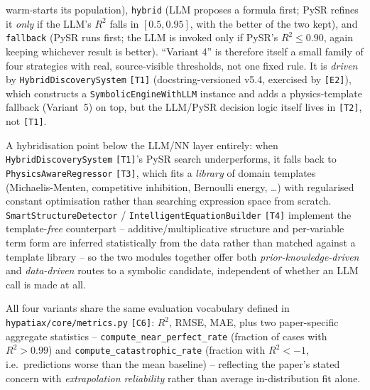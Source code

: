 \documentclass[11pt,a4paper]{article}
\newcommand{\code}[1]{\texttt{\small #1}}
\begin{document}
\begin{description}
        warm-starts its population), \code{hybrid} (LLM proposes a formula
        first; PySR refines it \emph{only} if the LLM's $R^2$ falls in
        $[0.5, 0.95]$, with the better of the two kept), and
        \code{fallback} (PySR runs first; the LLM is invoked only if PySR's
        $R^2 \leq 0.90$, again keeping whichever result is better). ``Variant
        4'' is therefore itself a small family of four strategies with
        real, source-visible thresholds, not one fixed rule. It is
        \emph{driven} by \code{HybridDiscoverySystem} \code{[T1]}
        (docstring-versioned v5.4, exercised by \code{[E2]}), which
        constructs a \code{SymbolicEngineWithLLM} instance and adds a
        physics-template fallback (Variant~5) on top, but the LLM/PySR
        decision logic itself lives in \code{[T2]}, not \code{[T1]}.
  \item[Variant~5 -- Template-guided physics fallback \code{[T3]}/\code{[T4]}]
        A hybridisation point below the LLM/NN layer entirely: when
        \code{HybridDiscoverySystem} \code{[T1]}'s PySR search underperforms,
        it falls back to \code{PhysicsAwareRegressor} \code{[T3]}, which
        fits a \emph{library} of domain templates (Michaelis-Menten,
        competitive inhibition, Bernoulli energy, \ldots) with regularised
        constant optimisation rather than searching expression space from
        scratch. \code{SmartStructureDetector} / \code{IntelligentEquationBuilder}
        \code{[T4]} implement the template-\emph{free} counterpart --
        additive/multiplicative structure and per-variable term form are
        inferred statistically from the data rather than matched against a
        template library -- so the two modules together offer both
        \emph{prior-knowledge-driven} and \emph{data-driven} routes to a
        symbolic candidate, independent of whether an LLM call is made at
        all.
\end{description}

All four variants share the same evaluation vocabulary defined in
\code{hypatiax/core/metrics.py} \code{[C6]}: $R^2$, RMSE, MAE, plus two
paper-specific aggregate statistics --
\code{compute\_near\_perfect\_rate} (fraction of cases with $R^2>0.99$) and
\code{compute\_catastrophic\_rate} (fraction with $R^2<-1$, i.e.\ predictions
worse than the mean baseline) -- reflecting the paper's stated concern with
\emph{extrapolation reliability} rather than average in-distribution fit
alone.

\end{document}
